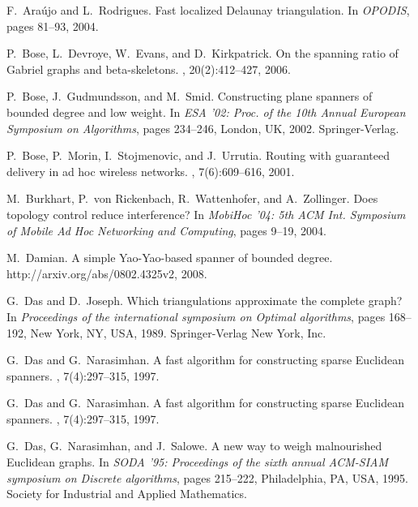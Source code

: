 \documentclass{llncs}
\begin{document}
\small
\def\cprime{}
\begin{thebibliography}{10}

F.~Ara{\'u}jo and L.~Rodrigues.
\newblock Fast localized {D}elaunay triangulation.
\newblock In {\em OPODIS}, pages 81--93, 2004.

P.~Bose, L.~Devroye, W.~Evans, and D.~Kirkpatrick.
\newblock On the spanning ratio of {G}abriel graphs and beta-skeletons.
, 20(2):412--427, 2006.

P.~Bose, J.~Gudmundsson, and M.~Smid.
\newblock Constructing plane spanners of bounded degree and low weight.
\newblock In {\em {ESA} '02: Proc. of the 10th Annual European Symposium on
  Algorithms}, pages 234--246, London, UK, 2002. Springer-Verlag.

P.~Bose, P.~Morin, I.~Stojmenovic, and J.~Urrutia.
\newblock Routing with guaranteed delivery in ad hoc wireless networks.
, 7(6):609--616, 2001.

M.~Burkhart, P.~von Rickenbach, R.~Wattenhofer, and A.~Zollinger.
\newblock Does topology control reduce interference?
\newblock In {\em {Mobi{Hoc}} '04: 5th ACM Int. Symposium of Mobile Ad Hoc
  Networking and Computing}, pages 9--19, 2004.

M.~Damian.
\newblock A simple {Y}ao-{Y}ao-based spanner of bounded degree.
\newblock http://arxiv.org/abs/0802.4325v2, 2008.

G.~Das and D.~Joseph.
\newblock Which triangulations approximate the complete graph?
\newblock In {\em Proceedings of the international symposium on Optimal
  algorithms}, pages 168--192, New York, NY, USA, 1989. Springer-Verlag New
  York, Inc.

G.~Das and G.~Narasimhan.
\newblock A fast algorithm for constructing sparse {E}uclidean spanners.
, 7(4):297--315, 1997.

G.~Das and G.~Narasimhan.
\newblock A fast algorithm for constructing sparse {E}uclidean spanners.
,
  7(4):297--315, 1997.

G.~Das, G.~Narasimhan, and J.~Salowe.
\newblock A new way to weigh malnourished {E}uclidean graphs.
\newblock In {\em SODA '95: Proceedings of the sixth annual ACM-SIAM symposium
  on Discrete algorithms}, pages 215--222, Philadelphia, PA, USA, 1995. Society
  for Industrial and Applied Mathematics.


\end{thebibliography}
\end{document}
